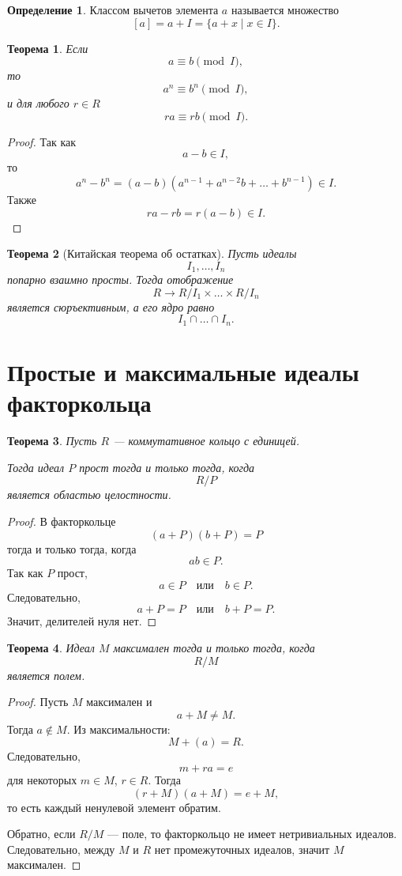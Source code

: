 \documentclass[12pt, a4paper]{article}
\newtheorem{theorem}{Теорема}
\theoremstyle{definition}
\newtheorem{definition}{Определение}
\theoremstyle{remark}
\begin{document}
\begin{definition}
	Классом вычетов элемента $a$ называется множество
	\[
	[a]=a+I=\{a+x\mid x\in I\}.
	\]
\end{definition}

\begin{theorem}
	Если
	\[
	a\equiv b\pmod I,
	\]
	то
	\[
	a^n\equiv b^n\pmod I,
	\]
	и для любого $r\in R$
	\[
	ra\equiv rb\pmod I.
	\]
\end{theorem}

\begin{proof}
	Так как
	\[
	a-b\in I,
	\]
	то
	\[
	a^n-b^n=(a-b)(a^{n-1}+a^{n-2}b+\dots+b^{n-1})\in I.
	\]
	Также
	\[
	ra-rb=r(a-b)\in I.
	\]
\end{proof}

\begin{theorem}[Китайская теорема об остатках]
	Пусть идеалы
	\[
	I_1,\dots,I_n
	\]
	попарно взаимно просты. Тогда отображение
	\[
	R\to R/I_1\times\dots\times R/I_n
	\]
	является сюръективным, а его ядро равно
	\[
	I_1\cap\dots\cap I_n.
	\]
\end{theorem}

\section{Простые и максимальные идеалы факторкольца}

\begin{theorem}
	Пусть $R$ --- коммутативное кольцо с единицей.
	
	Тогда идеал $P$ прост тогда и только тогда, когда
	\[
	R/P
	\]
	является областью целостности.
\end{theorem}

\begin{proof}
	В факторкольце
	\[
	(a+P)(b+P)=P
	\]
	тогда и только тогда, когда
	\[
	ab\in P.
	\]
	Так как $P$ прост,
	\[
	a\in P \quad \text{или}\quad b\in P.
	\]
	Следовательно,
	\[
	a+P=P \quad \text{или}\quad b+P=P.
	\]
	Значит, делителей нуля нет.
\end{proof}

\begin{theorem}
	Идеал $M$ максимален тогда и только тогда, когда
	\[
	R/M
	\]
	является полем.
\end{theorem}

\begin{proof}
	Пусть $M$ максимален и
	\[
	a+M\neq M.
	\]
	Тогда $a\notin M$. Из максимальности:
	\[
	M+(a)=R.
	\]
	Следовательно,
	\[
	m+ra=e
	\]
	для некоторых $m\in M$, $r\in R$. Тогда
	\[
	(r+M)(a+M)=e+M,
	\]
	то есть каждый ненулевой элемент обратим.
	
	Обратно, если $R/M$ --- поле, то факторкольцо не имеет нетривиальных идеалов. Следовательно, между $M$ и $R$ нет промежуточных идеалов, значит $M$ максимален.
\end{proof}
\end{document}
